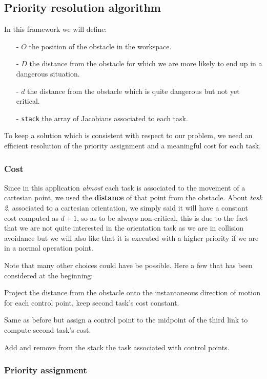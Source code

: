 \documentclass[12pt, a4paper]{article}
\begin{document}
\subsection{Priority resolution algorithm}
In this framework we will define:
\begin{enumerate}
\item[-] $O$ the position of the obstacle in the workspace.
\item[-] $D$ the distance from the obstacle for which we are more likely to end up in a dangerous situation.
\item[-] $d$ the distance from the obstacle which is quite dangerous but not yet critical.
\item[-] \texttt{stack} the array of Jacobians associated to each task.
\end{enumerate}
To keep a solution which is consistent with respect to our problem, we need an efficient resolution of the priority assignment and a meaningful cost for each task.
\subsubsection{Cost}
Since in this application \textit{almost} each task is associated to the movement of a cartesian point, we used the \textbf{distance} of that point from the obstacle.
About \textit{task 2}, associated to a cartesian orientation, we simply said it will have a constant cost computed as $d + 1$, so as to be always non-critical, this is due to the fact that we are not quite interested in the orientation task as we are in collision avoidance but we will also like that it is executed with a higher priority if we are in a normal operation point.

Note that many other choices could have be possible. Here a few that has been considered at the beginning:
\begin{list}{\textbf{Case:}}{}
\item Project the distance from the obstacle onto the instantaneous direction of motion for each control point, keep second task's cost constant.
\item Same as before but assign a control point to the midpoint of the third link to compute second task's cost.
\item Add and remove from the stack the task associated with control points.
\end{list}
\subsubsection{Priority assignment}
\end{document}
